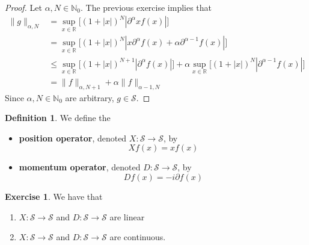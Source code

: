 \documentclass[12pt]{amsart}
\theoremstyle{definition}
\newtheorem{defn}[definition]{Definition}
\newtheorem{ex}[definition]{Exercise}
\newcommand{\p}{\partial}
\newcommand{\al}{\alpha}
\newcommand{\N}{\mathbb{N}}
\newcommand{\R}{\mathbb{R}}
\newcommand{\MS}{\mathcal{S}}
\begin{document}
	\begin{proof}
		Let $\al, N \in \N_0$. The previous exercise implies that  
		\begin{align*}
			\|g\|_{\al, N}
			&= \sup_{x \in \R}\bigg[ (1 + |x|)^N|\p^{\al} xf(x)| \bigg] \\
			& = \sup_{x \in \R}\bigg[ (1 + |x|)^N|x\p^{\al}f(x) + \al \p^{\al -1} f(x)| \bigg] \\
			& \leq \sup_{x \in \R}\bigg[ (1 + |x|)^{N+1}|\p^{\al}f(x)| \bigg] + \al \sup_{x \in \R}\bigg[  (1 + |x|)^N |\p^{\al-1} f(x)| \bigg] \\
			&= \|f\|_{\al, N+1} + \al \|f\|_{\al-1, N}
		\end{align*}
		Since $\al, N \in \N_0$ are arbitrary, $g \in \MS$.
	\end{proof}

	\begin{defn}
		We define the 
		\begin{itemize}
			\item \textbf{position operator}, denoted $X: \MS \rightarrow \MS$, by 
			$$Xf (x) = xf(x)$$
			\item \textbf{momentum operator}, denoted $D: \MS \rightarrow \MS$, by 
			$$Df (x) = -i\p f(x)$$
		\end{itemize} 
	\end{defn}

	\begin{ex}
		We have that 
		\begin{enumerate}
			\item $X: \MS \rightarrow \MS$ and $D: \MS \rightarrow \MS$ are linear
			\item $X: \MS \rightarrow \MS$ and $D: \MS \rightarrow \MS$ are continuous.
		\end{enumerate}
	\end{ex}
\end{document}

